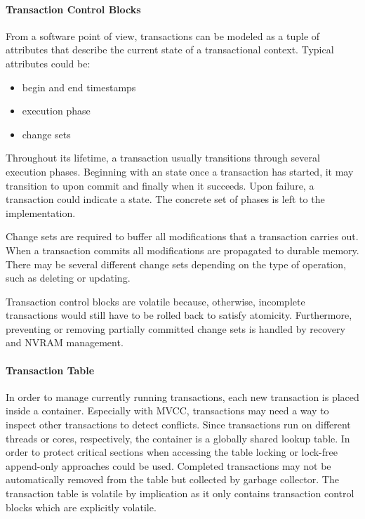\paragraph{Transaction Control Blocks}

From a software point of view, transactions can be modeled as a tuple of
attributes that describe the current state of a transactional context. Typical
attributes could be:

\begin{itemize}
    \item begin and end timestamps
    \item execution phase
    \item change sets
\end{itemize}

Throughout its lifetime, a transaction usually transitions through several
execution phases. Beginning with an  state once a transaction has
started, it may transition to  upon commit and finally
 when it succeeds. Upon failure, a transaction could indicate a
 state. The concrete set of phases is left to the implementation.

Change sets are required to buffer all modifications that a transaction carries
out. When a transaction commits all modifications are propagated to durable
memory. There may be several different change sets depending on the type of
operation, such as deleting or updating.

Transaction control blocks are volatile because, otherwise, incomplete
transactions would still have to be rolled back to satisfy atomicity.
Furthermore, preventing or removing partially committed change sets is handled
by recovery and NVRAM management.

\paragraph{Transaction Table}

In order to manage currently running transactions, each new transaction is
placed inside a container. Especially with MVCC, transactions may need a way to
inspect other transactions to detect conflicts. Since transactions run on
different threads or cores, respectively, the container is a globally shared
lookup table. In order to protect critical sections when accessing the table
locking or lock-free append-only approaches could be used. Completed
transactions may not be automatically removed from the table but collected by
garbage collector. The transaction table is volatile by implication as it only
contains transaction control blocks which are explicitly volatile.

